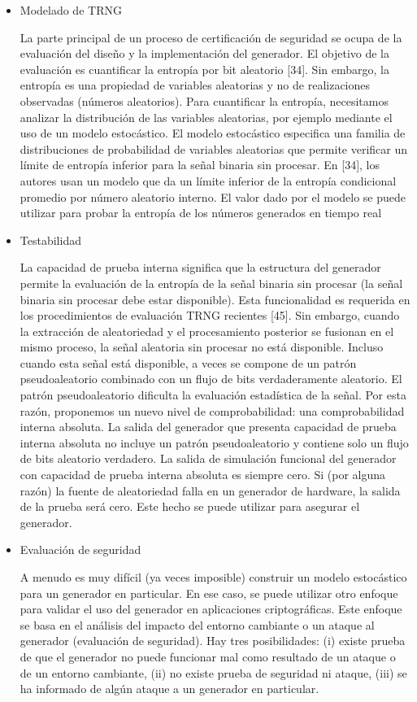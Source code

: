 \begin{itemize}
				\item Modelado de TRNG
				
					La parte principal de un proceso de certificación de seguridad se ocupa de la evaluación del diseño y la implementación del generador. El objetivo de la evaluación es cuantificar la entropía por bit aleatorio [34]. Sin embargo, la entropía es una propiedad de variables aleatorias y no de realizaciones observadas (números aleatorios). Para cuantificar la entropía, necesitamos analizar la distribución de las variables aleatorias, por ejemplo mediante el uso de un modelo estocástico. El modelo estocástico especifica una familia de distribuciones de probabilidad de variables aleatorias que permite verificar un límite de entropía inferior para la señal binaria sin procesar. En [34], los autores usan un modelo que da un límite inferior de la entropía condicional promedio por número aleatorio interno. El valor dado por el modelo se puede utilizar para probar la entropía de los números generados en tiempo real
				
				\item Testabilidad
				
					La capacidad de prueba interna significa que la estructura del generador permite la evaluación de la entropía de la señal binaria sin procesar (la señal binaria sin procesar debe estar disponible). Esta funcionalidad es requerida en los procedimientos de evaluación TRNG recientes [45]. Sin embargo, cuando la extracción de aleatoriedad y el procesamiento posterior se fusionan en el mismo proceso, la señal aleatoria sin procesar no está disponible. Incluso cuando esta señal está disponible, a veces se compone de un patrón pseudoaleatorio combinado con un flujo de bits verdaderamente aleatorio. El patrón pseudoaleatorio dificulta la evaluación estadística de la señal. Por esta razón, proponemos un nuevo nivel de comprobabilidad: una comprobabilidad interna absoluta. La salida del generador que presenta capacidad de prueba interna absoluta no incluye un patrón pseudoaleatorio y contiene solo un flujo de bits aleatorio verdadero. La salida de simulación funcional del generador con capacidad de prueba interna absoluta es siempre cero. Si (por alguna razón) la fuente de aleatoriedad falla en un generador de hardware, la salida de la prueba será cero. Este hecho se puede utilizar para asegurar el generador.
				
				\item Evaluación de seguridad
				
					A menudo es muy difícil (ya veces imposible) construir un modelo estocástico para un generador en particular. En ese caso, se puede utilizar otro enfoque para validar el uso del generador en aplicaciones criptográficas. Este enfoque se basa en el análisis del impacto del entorno cambiante o un ataque al generador (evaluación de seguridad). Hay tres posibilidades: (i) existe prueba de que el generador no puede funcionar mal como resultado de un ataque o de un entorno cambiante, (ii) no existe prueba de seguridad ni ataque, (iii) se ha informado de algún ataque a un generador en particular.
				

\end{itemize}

